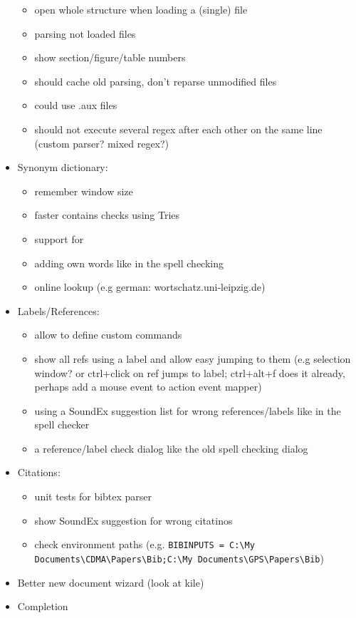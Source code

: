 \documentclass[10pt,a4paper,landscape]{report}
\begin{document}
\begin{itemize}
\begin{itemize}
		\item open whole structure when loading a (single)	 file
		\item parsing not loaded files
		\item show section/figure/table numbers
		\item should cache old parsing, don't reparse unmodified files
		\item could use .aux files
		\item should not execute several regex after each other on the same line (custom parser? mixed regex?)	
	\end{itemize}
	\item Synonym dictionary: \begin{itemize}
		\item remember window size
		\item faster contains checks using Tries
		\item support for 
		\item adding own words like in the spell checking 
		\item online lookup (e.g german: wortschatz.uni-leipzig.de)
	\end{itemize}
	\item Labels/References: \begin{itemize}
		\item allow to define custom commands
		\item show all refs using a label and allow easy jumping to them (e.g selection window? or ctrl+click on ref jumps to label; ctrl+alt+f does it already, perhaps add a mouse event to action event mapper)
		\item using a SoundEx suggestion list for wrong references/labels like in the spell checker
		\item a reference/label check dialog like the old spell checking dialog
	\end{itemize}
	\item Citations: \begin{itemize}
		\item unit tests for bibtex parser
		\item show SoundEx suggestion for wrong citatinos
		\item check environment paths (e.g. \verb+BIBINPUTS = C:\My Documents\CDMA\Papers\Bib;C:\My Documents\GPS\Papers\Bib+)
	\end{itemize}
	\item Better new document wizard (look at kile)
	\item Completion \begin{itemize}

\end{itemize}
\end{itemize}
\end{document}
